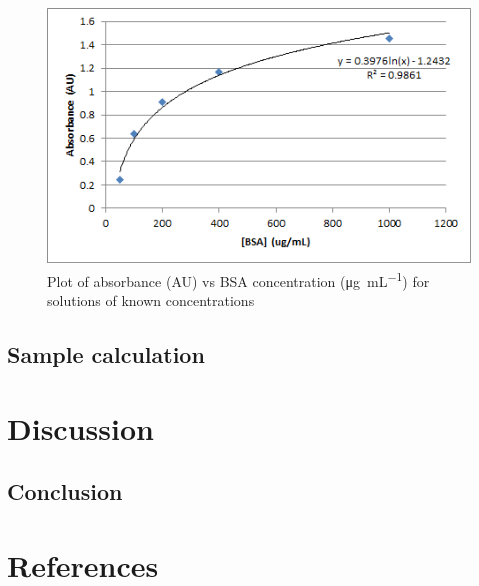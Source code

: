 \documentclass[12pt]{article}
\begin{document}
	\begin{figure}[h]
		\centering
		\includegraphics{stdcurve.png}
		\caption{Plot of absorbance (\si{AU}) vs BSA concentration (\si{\micro\gram\per\milli\liter}) for solutions of known concentrations}
		\label{stdcurve}
	\end{figure}
\subsection{Sample calculation}

\section{Discussion}


\subsection{Conclusion}


\section{References}
\end{document}
